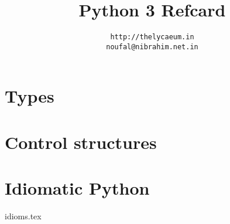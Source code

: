 \documentclass{refsheet}
\title{Python 3 Refcard}
\author {\texttt{http://thelycaeum.in}  \\ \texttt{noufal@nibrahim.net.in}}
\date{}
\begin{document}
\maketitle

\section{Types}







\section{Control structures}







\section{Idiomatic Python}
 {idioms.tex}

\pagebreak
\end{document}

